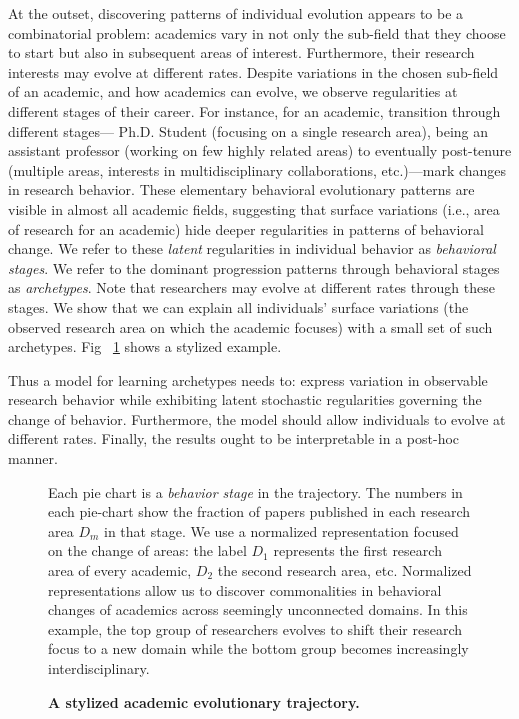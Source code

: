 \documentclass[10pt,letterpaper]{article}
\begin{document}

At the outset, discovering patterns of individual evolution appears to be a combinatorial problem: academics vary in not only the sub-field that they choose to start but also in subsequent areas of interest. Furthermore, their research interests may evolve at different rates. Despite variations in the chosen sub-field of an academic, and how academics can evolve, we observe regularities at different stages of their career. For instance, for an academic, transition through different stages--- Ph.D. Student (focusing on a single research area), being an assistant professor (working on few highly related areas) to eventually post-tenure (multiple areas, interests in multidisciplinary collaborations, etc.)---mark changes in research behavior. These elementary behavioral evolutionary patterns are visible in almost all academic fields, suggesting that surface variations (i.e., area of research for an academic) hide deeper regularities in patterns of behavioral change. We refer to these \textit{latent} regularities in individual behavior as \textit{behavioral stages}. We refer to the dominant progression patterns through behavioral stages as \textit{archetypes}. Note that researchers may evolve at different rates through these stages. We show that we can explain all individuals' surface variations (the observed research area on which the academic focuses) with a small set of such archetypes. Fig ~\ref{fig:example} shows a stylized example.

Thus a model for learning archetypes needs to: express variation in observable research behavior while exhibiting latent stochastic regularities governing the change of behavior. Furthermore, the model should allow individuals to evolve at different rates. Finally, the results ought to be interpretable in a post-hoc manner.

\begin{figure}[!h]
 \caption{\label{fig:example} \bf{A stylized academic evolutionary trajectory.}}
 Each pie chart is a \emph{behavior stage} in the trajectory. The numbers in each pie-chart show the fraction of papers published in each research area \textit{$D_m$} in that stage. We use a normalized representation focused on the change of areas: the label $D_1$ represents the first research area of every academic, $D_2$ the second research area, etc. Normalized representations allow us to discover commonalities in behavioral changes of academics across seemingly unconnected domains. In this example, the top group of researchers evolves to shift their research focus to a new domain while the bottom group becomes increasingly interdisciplinary.
\end{figure}
\end{document}
